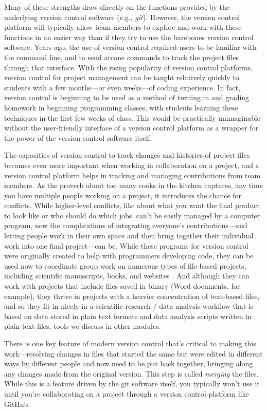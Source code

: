 \documentclass[]{tufte-book}
\begin{document}
Many of these strengths draw directly on the functions provided by the
underlying version control software (e.g., \emph{git}). However, the version control
platform will typically allow team members to explore and work with these
functions in an easier way than if they try to use the barebones version control
software. Years ago, the use of version control required users to
be familiar with the command line, and to send arcane commands to track the
project files through that interface. With the rising popularity of version
control platforms, version control for project management can be taught
relatively quickly to students with a few months---or even weeks---of coding
experience. In fact, version control is beginning to be used as a method of
turning in and grading homework in beginning programming classes, with students
learning these techniques in the first few weeks of class. This would be
practically unimaginable without the user-friendly interface of a version
control platform as a wrapper for the power of the version control software
itself.

The capacities of version control to track changes and histories of project
files becomes even more important when working in collaboration on a project,
and a version control platform helps in tracking and managing contributions from
team members. As the proverb about too many cooks in the kitchen captures, any
time you have multiple people working on a project, it introduces the chance for
conflicts. While higher-level conflicts, like about what you want the final
product to look like or who should do which jobs, can't be easily managed by a
computer program, now the complications of integrating everyone's
contributions---and letting people work in their own space and then bring
together their individual work into one final project---can be. While these
programs for version control were originally created to help with programmers
developing code, they can be used now to coordinate group work on numerous types
of file-based projects, including scientific manuscripts, books, and websites
\citep{raymondunderstanding}. And although they can work with projects that include
files saved in binary (Word documents, for example), they thrive in projects
with a heavier concentration of text-based files, and so they fit in nicely in a
scientific research / data analysis workflow that is based on data stored in
plain text formats and data analysis scripts written in plain text files, tools
we discuss in other modules.

There is one key feature of modern version control that's critical to making
this work---resolving changes in files that started the same but were edited in
different ways by different people and now need to be put back together,
bringing along any changes made from the original version. This step is called
\emph{merging} the files. While this is a feature driven by the git software itself,
you typically won't use it until you're collaborating on a project through
a version control platform like GitHub.
\end{document}
